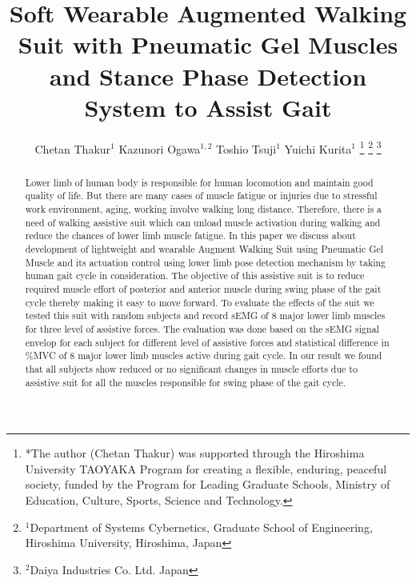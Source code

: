 \documentclass[letterpaper, 10 pt, conference]{ieeeconf}  %
\title{\LARGE \bf
Soft Wearable Augmented Walking Suit with Pneumatic Gel Muscles and Stance Phase Detection System to Assist Gait
}
\author{Chetan Thakur$^{1}$ Kazunori Ogawa$^{1,2}$ Toshio Tsuji$^{1}$ Yuichi Kurita$^{1}$%
\thanks{*The author (Chetan Thakur) was supported through the Hiroshima University
TAOYAKA Program for creating a flexible, enduring, peaceful society, funded by the Program for Leading
Graduate Schools, Ministry of Education, Culture, Sports, Science and Technology.}%
\thanks{$^{1}$Department of Systems Cybernetics, Graduate School of Engineering,
	Hiroshima University, Hiroshima, Japan
        {\tt\small }}%
\thanks{$^{2}$Daiya Industries Co. Ltd. Japan
        {\tt\small }}%
}
\begin{document}
\setlength{\pdfpageheight}{11in}
\setlength{\pdfpagewidth}{8.5in}

\maketitle
\thispagestyle{empty}
\pagestyle{empty}

\maketitle
\thispagestyle{empty}
\pagestyle{empty}


\begin{abstract}

Lower limb of human body is responsible for human locomotion and maintain good quality of life. But there are many cases of muscle fatigue or injuries due to stressful work environment, aging, working involve walking long distance. Therefore, there is a need of walking assistive suit which can unload muscle activation during walking and reduce the chances of lower limb muscle fatigue. In this paper we discuss about development of lightweight and wearable Augment Walking Suit using Pneumatic Gel Muscle and its actuation control using lower limb pose detection mechanism by taking human gait cycle in consideration. The objective of this assistive suit is to reduce required muscle effort of posterior and anterior muscle during swing phase of the gait cycle thereby making it easy to move forward. To evaluate the effects of the suit we tested this suit with random subjects and record sEMG of 8 major lower limb muscles for three level of assistive forces. The evaluation was done based on the sEMG signal envelop for each subject for different level of assistive forces and statistical difference in \%MVC of 8 major lower limb muscles active during gait cycle. In our result we found that all subjects show reduced or no significant changes in muscle efforts due to assistive suit for all the muscles responsible for swing phase of the gait cycle. 
\end{abstract}


\end{document}
